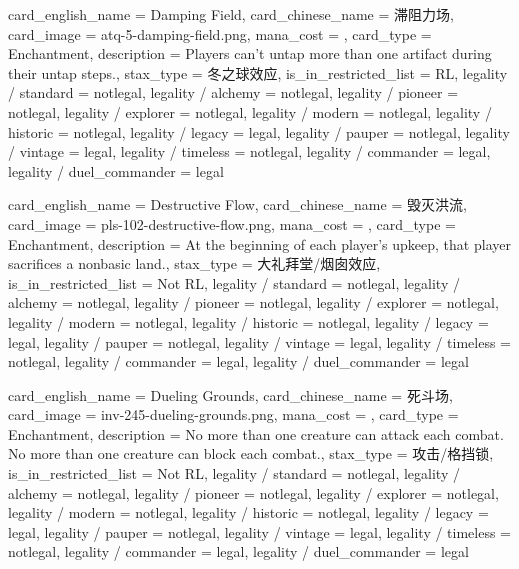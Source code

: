 \documentclass[lang = cn, color = black, 10pt]{AllThatStax}
\begin{document}
\card
{
	card_english_name = {Damping Field},
	card_chinese_name = {滞阻力场},
	card_image = atq-5-damping-field.png,
	mana_cost = ,
	card_type = Enchantment,
	description = {Players can't untap more than one artifact during their untap steps.},
	stax_type = 冬之球效应,
	is_in_restricted_list = RL,
	legality / standard = notlegal,
	legality / alchemy = notlegal,
	legality / pioneer = notlegal,
	legality / explorer = notlegal,
	legality / modern = notlegal,
	legality / historic = notlegal,
	legality / legacy = legal,
	legality / pauper = notlegal,
	legality / vintage = legal,
	legality / timeless = notlegal,
	legality / commander = legal,
	legality / duel_commander = legal
}

\card
{
	card_english_name = {Destructive Flow},
	card_chinese_name = {毁灭洪流},
	card_image = pls-102-destructive-flow.png,
	mana_cost = ,
	card_type = Enchantment,
	description = {At the beginning of each player's upkeep, that player sacrifices a nonbasic land.},
	stax_type = 大礼拜堂/烟囱效应,
	is_in_restricted_list = Not RL,
	legality / standard = notlegal,
	legality / alchemy = notlegal,
	legality / pioneer = notlegal,
	legality / explorer = notlegal,
	legality / modern = notlegal,
	legality / historic = notlegal,
	legality / legacy = legal,
	legality / pauper = notlegal,
	legality / vintage = legal,
	legality / timeless = notlegal,
	legality / commander = legal,
	legality / duel_commander = legal
}

\card
{
	card_english_name = {Dueling Grounds},
	card_chinese_name = {死斗场},
	card_image = inv-245-dueling-grounds.png,
	mana_cost = ,
	card_type = Enchantment,
	description = {No more than one creature can attack each combat.\\
		No more than one creature can block each combat.},
	stax_type = 攻击/格挡锁,
	is_in_restricted_list = Not RL,
	legality / standard = notlegal,
	legality / alchemy = notlegal,
	legality / pioneer = notlegal,
	legality / explorer = notlegal,
	legality / modern = notlegal,
	legality / historic = notlegal,
	legality / legacy = legal,
	legality / pauper = notlegal,
	legality / vintage = legal,
	legality / timeless = notlegal,
	legality / commander = legal,
	legality / duel_commander = legal
}
\end{document}
